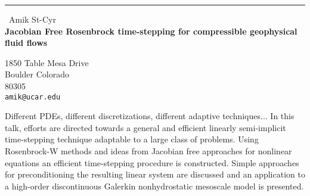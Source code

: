 \documentclass{report}
\begin{document}
\begin{center}
\rule{6in}{1pt} \
{\large Amik St-Cyr \\
{\bf Jacobian Free Rosenbrock time-stepping for compressible geophysical fluid flows}}

1850 Table Mesa Drive \\ Boulder Colorado \\ 80305
\\
{\tt amik@ucar.edu}\end{center}

Different PDEs, different discretizations, different adaptive techniques...
In this talk, efforts are directed towards a general and efficient linearly
semi-implicit time-stepping technique adaptable to a large class of
problems. Using Rosenbrock-W methods and ideas from Jacobian free
approaches for nonlinear equations an efficient time-stepping procedure
is constructed. Simple approaches for preconditioning the resulting linear
system are discussed and an application to a high-order discontinuous
Galerkin nonhydrostatic mesoscale model is presented.
\end{document}
